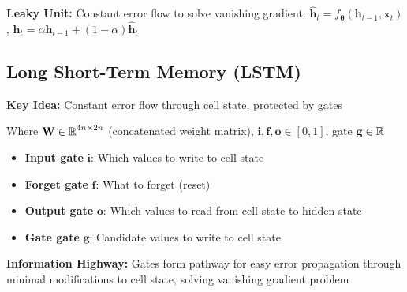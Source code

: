 \textbf{Leaky Unit:} Constant error flow to solve vanishing gradient: {\small $\hat{\mathbf{h}}_t = f_{\mathbf{\theta}}(\mathbf{h}_{t-1}, \mathbf{x}_t)$, $\mathbf{h}_t = \alpha \mathbf{h}_{t-1} + (1-\alpha) \hat{\mathbf{h}}_t$ }

\subsection{Long Short-Term Memory (LSTM)}

\textbf{Key Idea:} Constant error flow through cell state, protected by gates

{ \footnotesize
{}

}

Where $\mathbf{W} \in \operatorname{\mathbb{R}}^{4n \times 2n}$ (concatenated weight matrix), $\mathbf{i}, \mathbf{f}, \mathbf{o} \in [0,1]$, gate $\mathbf{g} \in \operatorname{\mathbb{R}}$


\begin{itemize}
    \item \textbf{Input gate} $\mathbf{i}$: Which values to write to cell state
    \item \textbf{Forget gate} $\mathbf{f}$: What to forget (reset)
    \item \textbf{Output gate} $\mathbf{o}$: Which values to read from cell state to hidden state
    \item \textbf{Gate gate} $\mathbf{g}$: Candidate values to write to cell state
\end{itemize}

\textbf{Information Highway:} Gates form pathway for easy error propagation through minimal modifications to cell state, solving vanishing gradient problem